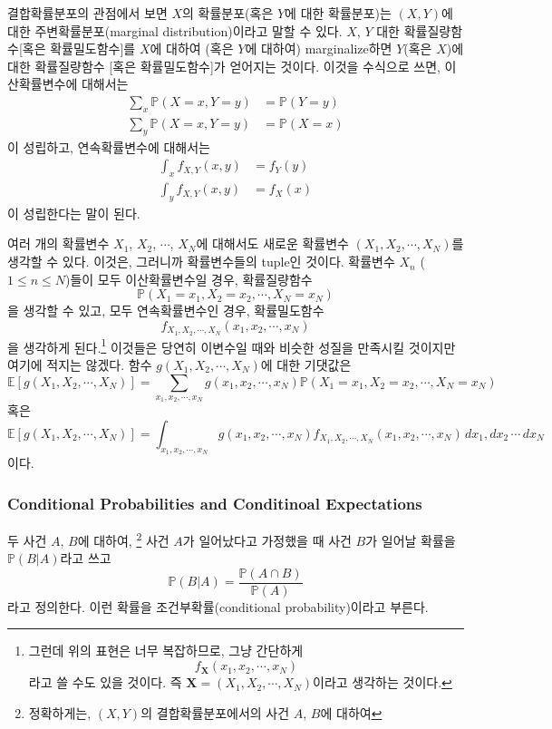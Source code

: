 \documentclass{article}
\begin{document}
결합확률분포의 관점에서 보면 \(X\)의 확률분포(혹은 \(Y\)에 대한 확률분포)는 \((X,Y)\)에 대한 주변확률분포(marginal distribution)이라고 말할 수 있다.
\(X\), \(Y\) 대한 확률질량함수[혹은 확률밀도함수]를 \(X\)에 대하여 (혹은 \(Y\)에 대하여) marginalize하면 \(Y\)(혹은 \(X\))에 대한 확률질량함수 [혹은 확률밀도함수]가 얻어지는 것이다.
이것을 수식으로 쓰면, 이산확률변수에 대해서는
\begin{align*}
\sum_x\mathbb P(X=x,Y=y)&=\mathbb P(Y=y)\\
\sum_y\mathbb P(X=x,Y=y)&=\mathbb P(X=x)
\end{align*}
이 성립하고, 연속확률변수에 대해서는
\begin{align*}
\int_xf_{X,Y}(x,y)&=f_Y(y)\\
\int_yf_{X,Y}(x,y)&=f_X(x)
\end{align*}
이 성립한다는 말이 된다.

여러 개의 확률변수 \(X_1\), \(X_2\), \(\cdots\), \(X_N\)에 대해서도 새로운 확률변수 \((X_1,X_2,\cdots,X_N)\)를 생각할 수 있다.
이것은, 그러니까 확률변수들의 tuple인 것이다.
확률변수 \(X_n\) (\(1\le n\le N\))들이 모두 이산확률변수일 경우, 확률질량함수
\[\mathbb P(X_1=x_1,X_2=x_2,\cdots,X_N=x_N)\]
을 생각할 수 있고, 모두 연속확률변수인 경우, 확률밀도함수
\[f_{X_1,X_2,\cdots,X_N}(x_1,x_2,\cdots,x_N)\]
을 생각하게 된다.\footnote{
그런데 위의 표현은 너무 복잡하므로, 그냥 간단하게
\[f_{\boldsymbol X}(x_1,x_2,\cdots,x_N)\]
라고 쓸 수도 있을 것이다.
즉 \(\boldsymbol X=(X_1,X_2,\cdots,X_N)\)이라고 생각하는 것이다.}
이것들은 당연히 이변수일 때와 비슷한 성질을 만족시킬 것이지만 여기에 적지는 않겠다.
함수 \(g(X_1,X_2,\cdots,X_N)\)에 대한 기댓값은
\[\mathbb E[g(X_1,X_2,\cdots,X_N)]=\sum_{x_1,x_2,\cdots,x_N}g(x_1,x_2,\cdots,x_N)\mathbb P(X_1=x_1,X_2=x_2,\cdots,X_N=x_N)\]
혹은
\[\mathbb E[g(X_1,X_2,\cdots,X_N)]=\int_{x_1,x_2,\cdots,x_N}g(x_1,x_2,\cdots,x_N)f_{X_1,X_2,\cdots,X_N}(x_1,x_2,\cdots,x_N)\,dx_1,dx_2\,\cdots\,dx_N\]
이다.

%
\subsubsection{Conditional Probabilities and Conditinoal Expectations}

두 사건 \(A\), \(B\)에 대하여,
\footnote{정확하게는, \((X,Y)\)의 결합확률분포에서의 사건 \(A\), \(B\)에 대하여}
사건 \(A\)가 일어났다고 가정했을 때 사건 \(B\)가 일어날 확률을 \(\mathbb P(B|A)\)라고 쓰고
\[\mathbb P(B|A)=\frac{\mathbb P(A\cap B)}{\mathbb P(A)}\]
라고 정의한다.
이런 확률을 조건부확률(conditional probability)이라고 부른다.
\end{document}
